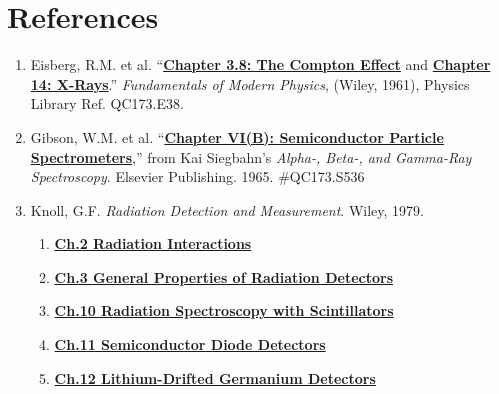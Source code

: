 \documentclass{../lab}
\begin{document}
\section{References}
\label{sec:References}

\begin{enumerate}
    \item Eisberg, R.M. et al. ``\href{https://drive.google.com/file/d/1WaAGMdbgqcJD74uc52pZhbCxo0W0Bfz0/view?usp=drive_link}{\textbf{Chapter 3.8: The Compton Effect}} and \href{https://drive.google.com/file/d/1RgSgeGHIig1zaYfk-iUQc4PV7HjRqEzq/view?usp=drive_link}{\textbf{Chapter 14: X-Rays}}.'' \emph{Fundamentals of Modern Physics}, (Wiley, 1961), Physics Library Ref. QC173.E38.

    \item Gibson, W.M. et al. ``\href{https://drive.google.com/file/d/1Fjq_jt0dNZI8iDMbazZDxunLXbMuzEbu/view?usp=drive_link}{\textbf{Chapter VI(B): Semiconductor Particle Spectrometers}},'' from Kai Siegbahn's \emph{Alpha-, Beta-, and Gamma-Ray Spectroscopy}. Elsevier Publishing. 1965. \#QC173.S536

    \item Knoll, G.F. \emph{Radiation Detection and Measurement}. Wiley, 1979. 
    \begin{enumerate}
    
        \item
        \href{https://drive.google.com/file/d/1OVyNDtPH2b4DAmpoF-W8SDDqO96Ps6Gr/view?usp=drive_link}{\textbf{Ch.2 Radiation Interactions}}

        \item
        \href{https://drive.google.com/file/d/1slm-rP1zll9ptP1PwxVsSA_lrpf3UMl_/view?usp=drive_link}{\textbf{Ch.3 General Properties of Radiation Detectors}}
        
        \item        \href{https://drive.google.com/file/d/1hL2bp21Cg0m2iJ34S5yGEmVo5298FAvh/view?usp=drive_link}{\textbf{Ch.10 Radiation Spectroscopy with Scintillators}}
    
        \item
        \href{https://drive.google.com/file/d/1HRslW-8lR0uusvyITW2et2T0cyuKFnZU/view?usp=drive_link}{\textbf{Ch.11 Semiconductor Diode Detectors}}
    
        \item \href{https://drive.google.com/file/d/1xjk41bithPdXHMeE1qheB1vPB_BPiiC8/view?usp=drive_link}{\textbf{Ch.12 Lithium-Drifted Germanium Detectors}}


\end{enumerate}
\end{enumerate}
\end{document}
